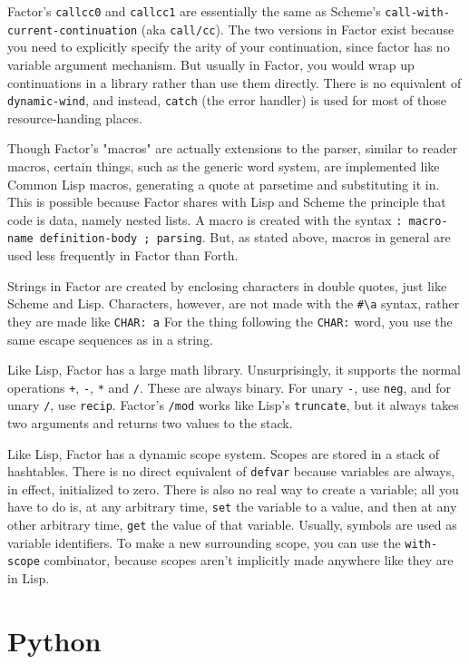 \documentclass{article}
\begin{document}
Factor's \texttt{callcc0} and \texttt{callcc1} are essentially the same as Scheme's \texttt{call-with-current-continuation} (aka \texttt{call/cc}). The two versions in Factor exist because you need to explicitly specify the arity of your continuation, since factor has no variable argument mechanism. But usually in Factor, you would wrap up continuations in a library rather than use them directly. There is no equivalent of \texttt{dynamic-wind}, and instead, \texttt{catch} (the error handler) is used for most of those resource-handing places.

Though Factor's "macros" are actually extensions to the parser, similar to reader macros, certain things, such as the generic word system, are implemented like Common Lisp macros, generating a quote at parsetime and substituting it in. This is possible because Factor shares with Lisp and Scheme the principle that code is data, namely nested lists. A macro is created with the syntax \verb|: macro-name definition-body ; parsing|. But, as stated above, macros in general are used less frequently in Factor than Forth.

Strings in Factor are created by enclosing characters in double quotes, just like Scheme and Lisp. Characters, however, are not made with the \verb|#\a| syntax, rather they are made like \verb|CHAR: a| For the thing following the \texttt{CHAR:} word, you use the same escape sequences as in a string.

Like Lisp, Factor has a large math library. Unsurprisingly, it supports the normal operations \texttt{+}, \texttt{-}, \texttt{*} and \texttt{/}. These are always binary. For unary \texttt{-}, use \texttt{neg}, and for unary \texttt{/}, use \texttt{recip}. Factor's \texttt{/mod} works like Lisp's \texttt{truncate}, but it always takes two arguments and returns two values to the stack.

Like Lisp, Factor has a dynamic scope system. Scopes are stored in a stack of hashtables. There is no direct equivalent of \texttt{defvar} because variables are always, in effect, initialized to zero. There is also no real way to create a variable; all you have to do is, at any arbitrary time, \texttt{set} the variable to a value, and then at any other arbitrary time, \texttt{get} the value of that variable. Usually, symbols are used as variable identifiers. To make a new surrounding scope, you can use the \texttt{with-scope} combinator, because scopes aren't implicitly made anywhere like they are in Lisp.

\section{Python}
\end{document}
